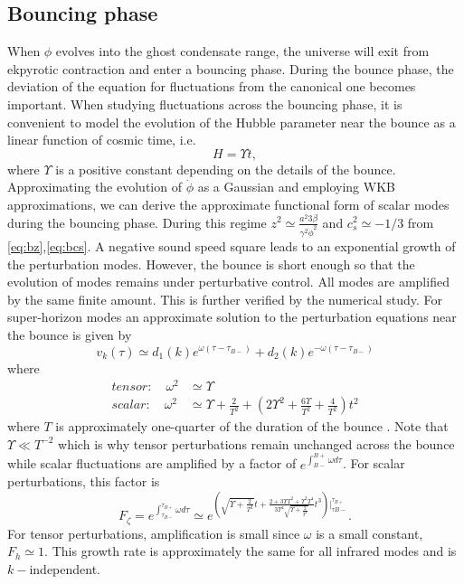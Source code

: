 \documentclass[12pt,a4paper]{article}
\numberwithin{equation}{section}
\numberwithin{equation}{section}
\begin{document}
\subsection{Bouncing phase}
When $\phi$ evolves into the ghost condensate range, the universe will exit from ekpyrotic contraction and enter a bouncing phase. During the bounce phase, the deviation of the equation for fluctuations from the canonical one becomes important. When studying fluctuations across the bouncing phase, it is convenient  to model the evolution of the Hubble parameter near the bounce as a linear function of cosmic time, i.e.
\begin{equation}
    H = \Upsilon t,
    \label{eq:hbounce}
\end{equation}
where $\Upsilon$ is a positive constant depending on the details of the bounce. Approximating the evolution of $\dot{\phi}$ as a Gaussian and employing WKB approximations, we can derive the approximate functional form of scalar modes during the bouncing phase. During this regime $z^2 \simeq \frac{a^2 3\beta }{\gamma^2\dot{\phi}^2}$ and $c_s^2 \simeq-1/3$ from \eqref{eq:bz},\eqref{eq:bcs}. A negative sound speed square leads to an exponential growth of the perturbation modes. However, the bounce is short enough so that the evolution of modes remains under perturbative control. All modes are amplified by the same finite amount. This is further verified by the numerical study.
For super-horizon modes
an approximate solution to the perturbation equations near the bounce is given by
\begin{equation}
    v_k(\tau) \simeq d_{1}(k) e^{\omega(\tau-\tau_{B-})} +  d_{2}(k) e^{-\omega(\tau-\tau_{B-})}
\end{equation} 
where 
\begin{equation}
\begin{split}
    tensor: \quad \omega^2 &\simeq \Upsilon    \\
   scalar: \quad \omega^2 &\simeq \Upsilon +\frac{2}{T^2} +\left(2\Upsilon^2+\frac{6\Upsilon}{T^2}+\frac{4}{T^2} \right) t^2 
    \end{split}
\end{equation}
where $T$ is approximately one-quarter of the duration of the bounce \cite{Cai:2012va}. Note that $\Upsilon \ll T^{-2}$ which is why
 tensor perturbations remain unchanged across the bounce while scalar fluctuations are amplified by a factor of $e^{\int_{B-}^{B+} \omega d\tau}$. For scalar perturbations, this factor is \cite{Cai:2007zv,Cai:2008ed,Cai:2008qw}
\begin{equation}
    F_{\zeta} = e^{\int_{\tau_{B-}}^{\tau_{B+}} \omega d\tau} \simeq e^{\left( \sqrt{\Upsilon+\frac{2}{T^2}} t+\frac{2+3 \Upsilon T^2+ \Upsilon^2 T^4}{3T^4\sqrt{\Upsilon+\frac{2}{T^2}}} t^3 \right)|_{\tau{B-}}^{\tau_{B+}}}.
\end{equation}
 For tensor perturbations, amplification is small since $\omega$ is a small constant, $F_h\simeq 1$. 
This growth rate is approximately the same for all infrared modes and is $k-$independent.
\end{document}
